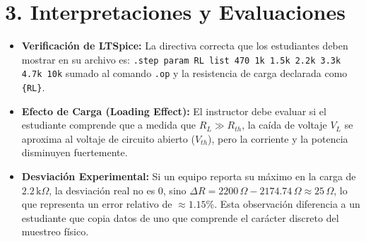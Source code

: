 \documentclass[11pt, a4paper]{article}
\begin{document}
\section*{3. Interpretaciones y Evaluaciones}
\begin{itemize}
    \item \textbf{Verificación de LTSpice:} La directiva correcta que los estudiantes deben mostrar en su archivo es: \texttt{.step param RL list 470 1k 1.5k 2.2k 3.3k 4.7k 10k} sumado al comando \texttt{.op} y la resistencia de carga declarada como \texttt{\{RL\}}.
    \item \textbf{Efecto de Carga (Loading Effect):} El instructor debe evaluar si el estudiante comprende que a medida que $R_L \gg R_{th}$, la caída de voltaje $V_L$ se aproxima al voltaje de circuito abierto ($V_{th}$), pero la corriente y la potencia disminuyen fuertemente.
    \item \textbf{Desviación Experimental:} Si un equipo reporta su máximo en la carga de $2.2\,\text{k}\Omega$, la desviación real no es $0$, sino $\Delta R = 2200\,\Omega - 2174.74\,\Omega \approx 25\,\Omega$, lo que representa un error relativo de $\approx 1.15\%$. Esta observación diferencia a un estudiante que copia datos de uno que comprende el carácter discreto del muestreo físico.
\end{itemize}
\end{document}
